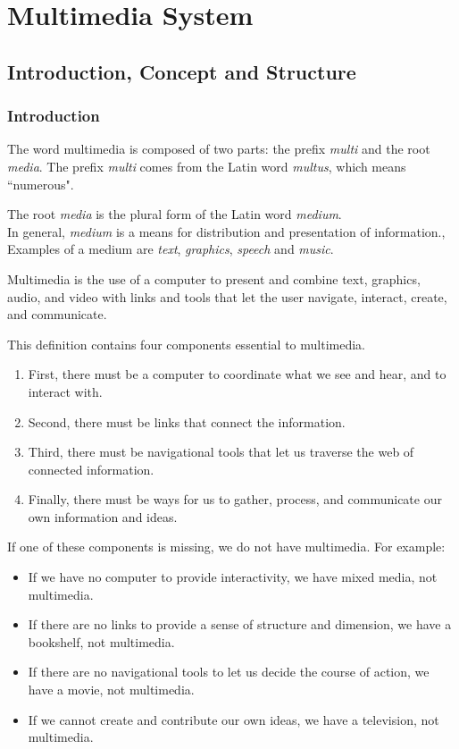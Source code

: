 \chapter{Multimedia System}

\section{Introduction, Concept and Structure}
\subsection{Introduction}
The word multimedia is composed of two parts: the prefix \emph{multi} and the root \emph{media}. The prefix \emph{multi} comes from the Latin word \emph{multus}, which means ``numerous".

The root \emph{media} is the plural form of the Latin word \emph{medium}. \\

In general, \textit{medium} is a means for distribution and presentation of
information., Examples of a medium are \textit{text}, \textit{graphics}, \textit{speech} and \textit{music}.


\noindent Multimedia is the use of a computer to present and combine text, graphics, audio, and video with links and tools that let the user navigate, interact, create, and communicate. 

This definition contains four components essential to multimedia. 
\begin{enumerate}
	\item First, there must be a computer to coordinate what we see and hear, and to interact with.
	\item Second, there must be links that connect the information. 
	\item Third, there must be navigational tools that let us traverse the web of connected information.
	\item Finally, there must be ways for us to gather, process, and communicate our own information and ideas.
\end{enumerate}

 If one of these components is missing, we do not have multimedia. For example:
 \begin{itemize}
 	\item If we have no computer to provide interactivity, we have mixed media, not multimedia. 
 	\item If there are no links to provide a sense of structure and dimension, we have a bookshelf, not multimedia. 
 	\item If there are no navigational tools to let us decide the course of action, we have a movie, not multimedia. 
 	\item If we cannot create and contribute our own ideas, we have a television, not multimedia.
 \end{itemize}

